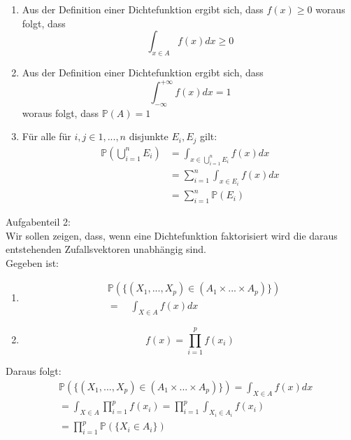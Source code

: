 \begin{enumerate}
\item Aus der Definition einer Dichtefunktion ergibt sich, dass $f(x)\geq 0$ woraus folgt, dass \begin{equation*}\int_{x\in A}f(x)dx\geq 0 \end{equation*}
\item Aus der Definition einer Dichtefunktion ergibt sich, dass \begin{equation*}\int_{-\infty}^{+\infty}f(x)dx= 1 \end{equation*} woraus folgt, dass $\mathbb{P}(A)=1$
\item Für alle für $i,j\in 1,...,n$ disjunkte $E_i,E_j$ gilt:
\begin{align*}
\mathbb{P}(\bigcup_{i=1}^{n} E_i)&=\int_{x\in \bigcup_{i=1}^{n}E_i}{f(x)dx}\\
&=\sum_{i=1}^{n}{\int_{x\in E_i}{f(x)dx}}\\
&=\sum_{i=1}^{n}{\mathbb{P}(E_i)}
\end{align*}
\end{enumerate}
Aufgabenteil 2:\\
Wir sollen zeigen, dass, wenn eine Dichtefunktion faktorisiert wird die daraus entstehenden Zufallsvektoren unabhängig sind.\\
Gegeben ist:
\begin{enumerate}
\item \begin{align*}&\mathbb{P}(\{(X_{1}, ... , X_{p}) \in (A_{1} \times ... \times A_{p})\} )\\ &= \quad \int_{X \in A}{f(x)dx}\end{align*}
\item \begin{equation*}f(x) = \prod_{i=1}^{p}{f(x_{i})}\end{equation*}
\end{enumerate}
Daraus folgt:
\begin{align*}
&\mathbb{P}(\{(X_{1}, ... , X_{p}) \in (A_{1} \times ... \times A_{p})\} ) = \int_{X \in A}{f(x)dx}\\
&= \int_{X \in A}{\prod_{i=1}^{p}{f(x_{i})}} = \prod_{i=1}^{p}{\int_{X_{i} \in A_{i}}{f(x_{i})}}\\
&= \prod_{i=1}^{p}{\mathbb{P} (\{X_{i} \in A_{i}\})}
\end{align*}

